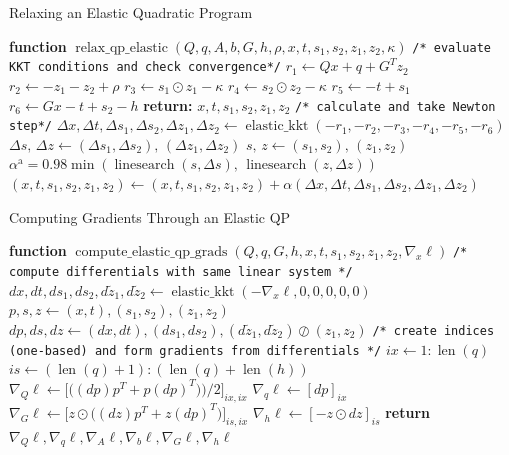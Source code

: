 \begin{algorithm}
\caption{Relaxing an Elastic Quadratic Program}\label{qpax:alg:relax_elastic_qp}
\begin{algorithmic}[1]
\State \textbf{function} $\operatorname{relax\_qp\_elastic}(Q,q,A, b, G,h, \rho, x, t, s_1, s_2, z_1, z_2, \kappa)$ %
\State \texttt{/* evaluate KKT conditions and check convergence*/}
\State $r_1 \gets Qx + q  + G^Tz_2$ %
\State $r_2 \gets -z_1 - z_2 + \rho$ 
\State $r_3 \gets s_1 \odot z_1 - \kappa$  
\State $r_4 \gets s_2 \odot z_2 - \kappa$  
\State $r_5 \gets -t + s_1 $ 
\State $r_6 \gets Gx - t + s_2 - h$
\State \textbf{return:} $x, t, s_1, s_2, z_1, z_2$
\EndIf 
\State 
\State \texttt{/* calculate and take Newton step*/}
\State $\Delta x, \Delta t, \Delta s_1, \Delta s_2, \Delta z_1, \Delta z_2\gets \operatorname{elastic\_kkt}(-r_1, -r_2, -r_3, -r_4, -r_5, -r_6)$ 
\State $\Delta s,\, \Delta z\gets (\Delta s_1, \Delta s_2), \,(\Delta z_1, \Delta z_2)$
\State $s,\, z \gets (s_1,s_2), \, (z_1, z_2)$
\State $\alpha^\text{a} = 0.98 \min( \operatorname{linesearch}(s, \Delta s),\, \operatorname{linesearch}(z, \Delta z) )$ \Comment{\eqref{qpax:sec:background:linesearch}}
\State $(x, t, s_1, s_2, z_1, z_2) \gets (x, t, s_1, s_2, z_1, z_2)  + \alpha(\Delta x, \Delta t, \Delta s_1, \Delta s_2,  \Delta z_1, \Delta z_2)$
\EndFor
\end{algorithmic}
\end{algorithm}
%
\begin{algorithm} 
\begin{algorithmic}[1]
    \caption{Computing Gradients Through an Elastic QP}\label{qpax:alg:opt_net_elastic}
        \State \textbf{function} $\operatorname{compute\_elastic\_qp\_grads}(Q, q, G, h, x, t,s_1,s_2,z_1,z_2,\nabla_x \ell)$ %
        \State \texttt{/* compute differentials with same linear system */}
        \State $dx, dt, ds_1, ds_2, d\tilde{z}_1, d\tilde{z}_2 \gets \operatorname{elastic\_kkt}(-\nabla_x \ell, 0, 0, 0, 0, 0)$
        \State $p, s, z \gets (x, t), (s_1, s_2), (z_1, z_2)$ 
        \State $dp, ds, dz \gets (dx, dt), (ds_1, ds_2), (d\tilde{z}_1, d\tilde{z}_2) \oslash (z_1, z_2)$
        \State \texttt{/* create indices (one-based) and form gradients from differentials */}
        \State $ix \gets 1:\operatorname{len}(q)$ 
        \State $is \gets (\operatorname{len}(q) + 1):(\operatorname{len}(q) + \operatorname{len}(h))$
        \State $\nabla_Q \ell \gets \big[ \big((dp) p^T + p (dp)^T)\big)/2 \big]_{ix,ix}$
        \State $\nabla_q \ell \gets [dp]_{ix}$
        \State $\nabla_G \ell \gets \big[ z \odot \big((dz)p^T + z(dp)^T\big) \big]_{is, ix}$
        \State $\nabla_h \ell \gets [-z \odot dz]_{is}$
    \State \textbf{return} $\nabla_Q \ell, \nabla_q \ell, \nabla_A \ell, \nabla_b \ell, \nabla_G \ell, \nabla_h \ell$ 
\end{algorithmic}
\end{algorithm}
